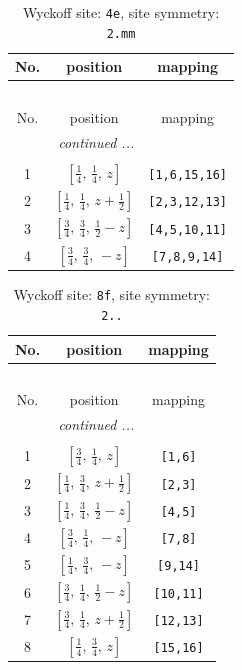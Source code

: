 \documentclass[fleqn,8pt]{jsarticle}
\begin{document}
\renewcommand{\arraystretch}{1.2}
\begin{longtable}{ccc}
\caption{Wyckoff site: {\tt 4e}, site symmetry: {\tt 2.mm}}
 \\
 \hline \hline
No. & position & mapping \\ \hline \endfirsthead

\multicolumn{2}{l}{\tablename\ \thetable{}} \\
 \hline \hline
No. & position & mapping \\ \hline \endhead

 \hline \hline
\multicolumn{2}{r}{\footnotesize\it continued ...} \\ \endfoot

 \hline \hline
\multicolumn{2}{r}{} \\ \endlastfoot

1 & $\left[ \frac{1}{4},\, \frac{1}{4},\, z \right]$ & {\tt [1,6,15,16]} \\ \hline
2 & $\left[ \frac{1}{4},\, \frac{1}{4},\, z + \frac{1}{2} \right]$ & {\tt [2,3,12,13]} \\ \hline
3 & $\left[ \frac{3}{4},\, \frac{3}{4},\, \frac{1}{2} - z \right]$ & {\tt [4,5,10,11]} \\ \hline
4 & $\left[ \frac{3}{4},\, \frac{3}{4},\, - z \right]$ & {\tt [7,8,9,14]} \\
\end{longtable}
\renewcommand{\arraystretch}{1.2}
\begin{longtable}{ccc}
\caption{Wyckoff site: {\tt 8f}, site symmetry: {\tt 2..}}
 \\
 \hline \hline
No. & position & mapping \\ \hline \endfirsthead

\multicolumn{2}{l}{\tablename\ \thetable{}} \\
 \hline \hline
No. & position & mapping \\ \hline \endhead

 \hline \hline
\multicolumn{2}{r}{\footnotesize\it continued ...} \\ \endfoot

 \hline \hline
\multicolumn{2}{r}{} \\ \endlastfoot

1 & $\left[ \frac{3}{4},\, \frac{1}{4},\, z \right]$ & {\tt [1,6]} \\ \hline
2 & $\left[ \frac{1}{4},\, \frac{3}{4},\, z + \frac{1}{2} \right]$ & {\tt [2,3]} \\ \hline
3 & $\left[ \frac{1}{4},\, \frac{3}{4},\, \frac{1}{2} - z \right]$ & {\tt [4,5]} \\ \hline
4 & $\left[ \frac{3}{4},\, \frac{1}{4},\, - z \right]$ & {\tt [7,8]} \\ \hline
5 & $\left[ \frac{1}{4},\, \frac{3}{4},\, - z \right]$ & {\tt [9,14]} \\ \hline
6 & $\left[ \frac{3}{4},\, \frac{1}{4},\, \frac{1}{2} - z \right]$ & {\tt [10,11]} \\ \hline
7 & $\left[ \frac{3}{4},\, \frac{1}{4},\, z + \frac{1}{2} \right]$ & {\tt [12,13]} \\ \hline
8 & $\left[ \frac{1}{4},\, \frac{3}{4},\, z \right]$ & {\tt [15,16]} \\
\end{longtable}
\end{document}
